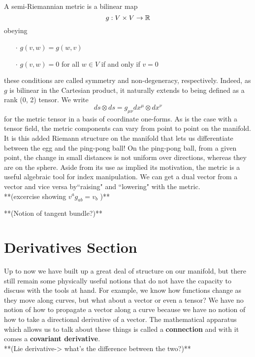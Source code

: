 A semi-Riemannian metric is a bilinear map 
\begin{equation*}
	g: V\times V \to \mathbb{R}
\end{equation*}
obeying 
\begin{enumerate}
	\item[$\cdot$] $g(v, w) = g(w, v)$
	\item[$\cdot$] $g(v, w) = 0$ for all $w \in V$ if and only if $v = 0$  
\end{enumerate}
these conditions are called symmetry and non-degeneracy, respectively.  Indeed, as $g$ is bilinear in the Cartesian product, it naturally extends to being defined as a rank (0, 2) tensor.  We write
\begin{equation*}
	ds\otimes ds = g_{\mu\nu}dx^{\mu}\otimes dx^{\nu}
\end{equation*}
for the metric tensor in a basis of coordinate one-forms.  As is the case with a tensor field, the metric components can vary from point to point on the manifold.  It is this added Riemann structure on the manifold that lets us differentiate between the egg and the ping-pong ball!   On the ping-pong ball, from a given point, the change in small distances is not uniform over directions, whereas they are on the sphere.  Aside from its use as implied its motivation, the metric is a useful algebraic tool for index manipulation.  We can get a dual vector from a vector and vice versa by``raising" and ``lowering" with the metric.\\

**(excercise showing $v^a g_{ab} = v_b$ )**

**(Notion of tangent bundle?)**
 
 \section*{Derivatives Section}
 Up to now we have built up a great deal of structure on our manifold, but there still remain some physically useful notions that do not have the capacity to discuss with the tools at hand.  For example, we know how functions change as they move along curves, but what about a vector or even a tensor?  We have no notion of how to propagate a vector along a curve because we have no notion of how to take a directional derivative of a vector.  The mathematical apparatus which allows us to talk about these things is called a \textbf{connection} and with it comes a \textbf{covariant derivative}.\\ 
 
 **(Lie derivative-> what's the difference between the two?)**
 
   
 
  



